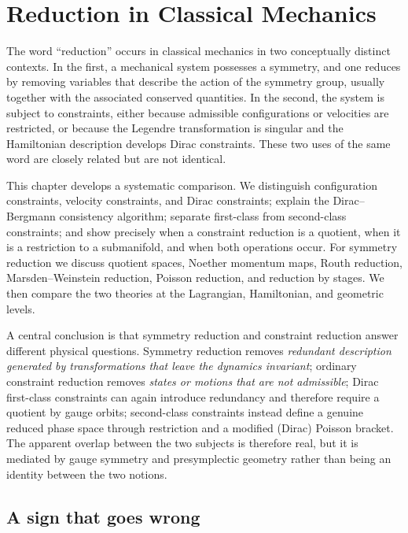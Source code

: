 \chapter{Reduction in Classical Mechanics}
\label{ch:rd}

The word ``reduction'' occurs in classical mechanics in two conceptually distinct
contexts.  In the first, a mechanical system possesses a symmetry, and one
reduces by removing variables that describe the action of the symmetry group,
usually together with the associated conserved quantities.  In the second, the
system is subject to constraints, either because admissible configurations or
velocities are restricted, or because the Legendre transformation is singular
and the Hamiltonian description develops Dirac constraints.  These two uses of
the same word are closely related but are not identical.

This chapter develops a systematic comparison.  We distinguish configuration
constraints, velocity constraints, and Dirac constraints; explain the
Dirac--Bergmann consistency algorithm; separate first-class from second-class
constraints; and show precisely when a constraint reduction is a quotient,
when it is a restriction to a submanifold, and when both operations occur.
For symmetry reduction we discuss quotient spaces, Noether momentum maps,
Routh reduction, Marsden--Weinstein reduction, Poisson reduction, and
reduction by stages.  We then compare the two theories at the Lagrangian,
Hamiltonian, and geometric levels.

A central conclusion is that symmetry reduction and constraint reduction
answer different physical questions.  Symmetry reduction removes \emph{redundant
description generated by transformations that leave the dynamics invariant};
ordinary constraint reduction removes \emph{states or motions that are not
admissible}; Dirac first-class constraints can again introduce redundancy and
therefore require a quotient by gauge orbits; second-class constraints instead
define a genuine reduced phase space through restriction and a modified
(Dirac) Poisson bracket.  The apparent overlap between the two subjects is
therefore real, but it is mediated by gauge symmetry and presymplectic
geometry rather than being an identity between the two notions.


\section{A sign that goes wrong}
\label{sec:rd-sign}

